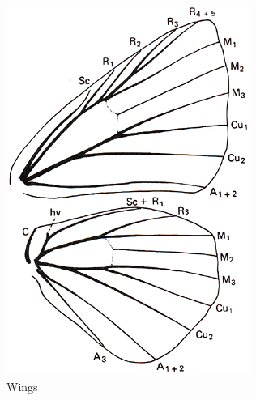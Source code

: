 \documentclass[letterpaper, 11pt]{article}
\begin{document}
\begin{figure}[ht!]
    \centering
    \begin{subfigure}[ht!]{0.28\textwidth}
        \includegraphics[width=\textwidth]{image13}
        \caption{Wings}
        \label{fig:lycaenid1}
    \end{subfigure}
    \qquad %
    \begin{subfigure}[ht!]{0.4\textwidth}

\end{subfigure}
\end{figure}
\end{document}
